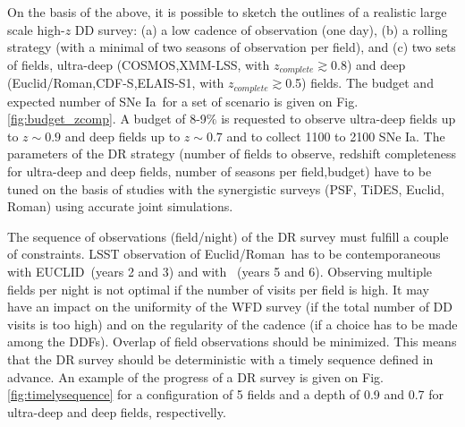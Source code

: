 \documentclass[skiphelvet,twocolumn]{lsstdescnote}
\newcommand{\cosmos}{{COSMOS}}
\newcommand{\elais}{{ELAIS-S1}}
\newcommand{\xmm}{{XMM-LSS}}
\newcommand{\cdfs}{{CDF-S}}
\newcommand{\adfs}{{Euclid/Roman}}
\newcommand{\euclid}{{EUCLID}}
\newcommand{\sne}{{SNe Ia}}
\newcommand{\zcomp}{\mbox{$z_{complete}$}}
\begin{document}
\par
On the basis of the above, it is possible to sketch the outlines of a realistic large scale high-$z$ DD survey: (a) a low cadence of observation (one day), (b) a rolling strategy (with a minimal of two seasons of observation per field), and (c) two sets of fields, ultra-deep (\cosmos,\xmm, with \zcomp$\gtrsim$0.8) and deep (\adfs,\cdfs,\elais, with \zcomp$\gtrsim$0.5) fields. The budget and expected number of \sne~for a set of scenario is given on Fig. \ref{fig:budget_zcomp}. A budget of 8-9$\%$ is requested to observe ultra-deep fields up to $z\sim0.9$ and deep fields up to $z\sim0.7$ and to collect 1100 to 2100 \sne. The parameters of the DR strategy (number of fields to observe, redshift completeness for ultra-deep and deep fields, number of seasons per field,budget) have to be tuned on the basis of studies with the synergistic surveys (PSF, TiDES, Euclid, Roman) using accurate joint simulations.
\par
The sequence of observations (field/night) of the DR survey must fulfill a couple of constraints. LSST observation of \adfs~has to be contemporaneous with \euclid~(years 2 and 3) and with \roman~(years 5 and 6). Observing multiple fields per night is not optimal if the number of visits per field is high. It may have an impact on the uniformity of the WFD survey (if the total number of DD visits is too high) and on the regularity of the cadence (if a choice has to be made among the DDFs). Overlap of field observations should be minimized. This means that the DR survey should be deterministic with a timely sequence defined in advance. An example of the progress of a DR survey is given on Fig. \ref{fig:timelysequence} for a configuration of 5 fields and a depth of 0.9 and 0.7 for ultra-deep and deep fields, respectivelly. 
\end{document}
